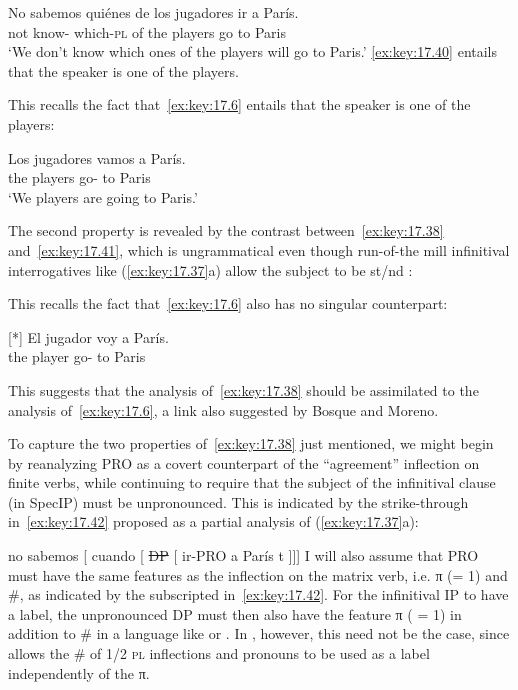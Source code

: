 \documentclass[output=paper]{langsci/langscibook}
\begin{document}
\ea\label{ex:key:17.40}
    \gll    No sabemos quiénes de los jugadores ir a París.\\
            not know-\Fpl{} which-\textsc{pl} of the players go to Paris\\
    \glt    ‘We don’t know which ones of the players will go to Paris.’
\z
\eqref{ex:key:17.40} entails that the speaker is one of the players.

This recalls the fact that~\eqref{ex:key:17.6} entails that the speaker is one of
the players:

\begin{exe}
\exi{\eqref{ex:key:17.6}}
    \gll    Los jugadores vamos a París.\\
            the players      go-\Fpl{} to Paris\\
    \glt    ‘We players are going to Paris.’\\
\end{exe}
The second property is revealed by the contrast between~\eqref{ex:key:17.38}
and~\eqref{ex:key:17.41}, which is ungrammatical even though run-of-the mill
infinitival interrogatives like (\ref{ex:key:17.37}a) allow the subject to be
\First{}st/\Second{}nd \Sg:

\label{ex:key:17.41}
\z
This recalls the fact that~\eqref{ex:key:17.6} also has no singular counterpart:

\begin{exe}
\exi{\eqref{ex:key:17.19}}[*]{%
    \gll El jugador voy a París.\\
        the player go-\Fsg{} to Paris\\
    \glt}
\end{exe}
This suggests that the analysis of~\eqref{ex:key:17.38} should be assimilated to the
analysis of~\eqref{ex:key:17.6}, a link also suggested by Bosque and Moreno.

To capture the two properties of~\eqref{ex:key:17.38} just mentioned, we might
begin by reanalyzing PRO as a covert counterpart of the “agreement” inflection
on finite verbs, while continuing to require that the subject of the
infinitival clause (in SpecIP) must be unpronounced. This is indicated by the
strike-through in~\eqref{ex:key:17.42} proposed as a partial analysis of
(\ref{ex:key:17.37}a):

\ea\label{ex:key:17.42}
    no sabemos\tss{\Fpl} [ cuando [ \sout{DP} [ ir-PRO\tss{\Fpl} a París t ]]]
\z
I will also assume that PRO must have the same features as the
inflection on the matrix verb, i.e. π (= 1) and \#, as indicated by the
subscripted \Fpl{} in~\eqref{ex:key:17.42}. For the infinitival IP to have a
label, the unpronounced DP must then also have the feature π ( = 1) in addition
to \# in a language like  or . In ,
however, this need not be the case, since  allows the \# of 1/2
\textsc{pl} inflections and pronouns to be used as a label independently of the
π.
\end{document}
